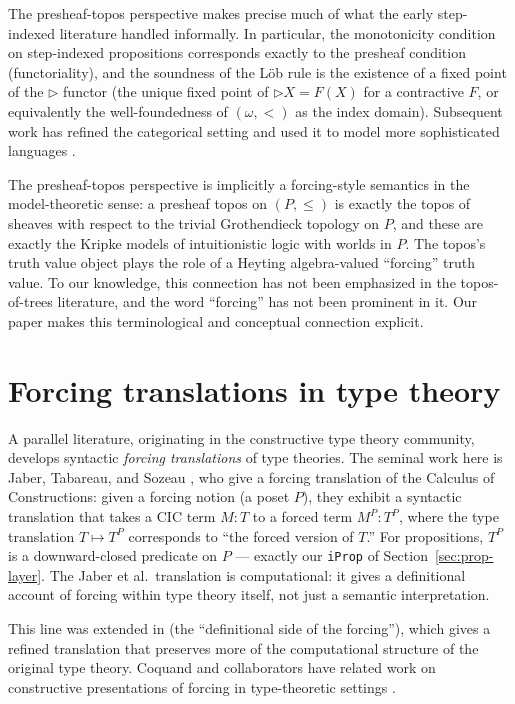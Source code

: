 \documentclass[11pt]{article}
\begin{document}
The presheaf-topos perspective makes precise much of what the early
step-indexed literature handled informally. In particular, the
monotonicity condition on step-indexed propositions corresponds
exactly to the presheaf condition (functoriality), and the soundness
of the Löb rule is the existence of a fixed point of the
$\triangleright$ functor (the unique fixed point of $\triangleright X
= F(X)$ for a contractive $F$, or equivalently the well-foundedness
of $(\omega, <)$ as the index domain). Subsequent work has refined
the categorical setting and used it to model more sophisticated
languages \cite{bizjak-grathwohl-clouston-mogelberg-birkedal-2016}.

The presheaf-topos perspective is implicitly a forcing-style semantics
in the model-theoretic sense: a presheaf topos on $(P, \le)$ is
exactly the topos of sheaves with respect to the trivial Grothendieck
topology on $P$, and these are exactly the Kripke models of
intuitionistic logic with worlds in $P$. The topos's truth value
object plays the role of a Heyting algebra-valued ``forcing'' truth
value. To our knowledge, this connection has not been emphasized in
the topos-of-trees literature, and the word ``forcing'' has not been
prominent in it. Our paper makes this terminological and conceptual
connection explicit.

\section{Forcing translations in type theory}
\label{sec:jts}

A parallel literature, originating in the constructive type theory
community, develops syntactic \emph{forcing translations} of type
theories. The seminal work here is Jaber, Tabareau, and Sozeau
\cite{jaber-tabareau-sozeau-2012}, who give a forcing translation of
the Calculus of Constructions: given a forcing notion (a poset
$P$), they exhibit a syntactic translation that takes a CIC term
$M : T$ to a forced term $M^P : T^P$, where the type translation
$T \mapsto T^P$ corresponds to ``the forced version of $T$.'' For
propositions, $T^P$ is a downward-closed predicate on $P$ ---
exactly our \texttt{iProp} of Section~\ref{sec:prop-layer}. The
Jaber et al.\ translation is computational: it gives a definitional
account of forcing within type theory itself, not just a semantic
interpretation.

This line was extended in
\cite{jaber-et-al-2016} (the ``definitional side of the forcing''),
which gives a refined translation that preserves more of the
computational structure of the original type theory. Coquand and
collaborators have related work on constructive presentations of
forcing in type-theoretic settings \cite{coquand-jaber2010}.
\end{document}
